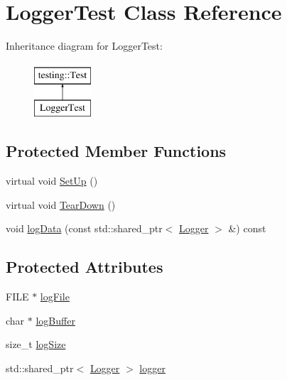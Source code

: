 \hypertarget{classLoggerTest}{}\section{Logger\+Test Class Reference}
\label{classLoggerTest}
Inheritance diagram for Logger\+Test\+:\begin{figure}[H]
\begin{center}
\leavevmode
\includegraphics[height=2.000000cm]{classLoggerTest}
\end{center}
\end{figure}
\subsection*{Protected Member Functions}
\begin{DoxyCompactItemize}
\item 
virtual void \mbox{\hyperlink{classLoggerTest_afcaba51d4a2e5229bc9e16bf70bc2713}{Set\+Up}} ()
\item 
virtual void \mbox{\hyperlink{classLoggerTest_a15b74baf82578cfb0cd04cd978bc248f}{Tear\+Down}} ()
\item 
void \mbox{\hyperlink{classLoggerTest_a5806192b9f0f6436fb32f6be8b1939ba}{log\+Data}} (const std\+::shared\+\_\+ptr$<$ \mbox{\hyperlink{classokapi_1_1Logger}{Logger}} $>$ \&) const
\end{DoxyCompactItemize}
\subsection*{Protected Attributes}
\begin{DoxyCompactItemize}
\item 
F\+I\+LE $\ast$ \mbox{\hyperlink{classLoggerTest_a1890b91ba06a9e04127a11d47a5d96c6}{log\+File}}
\item 
char $\ast$ \mbox{\hyperlink{classLoggerTest_ad2b73d8c0b5fbcb8557326e0e3cff06a}{log\+Buffer}}
\item 
size\+\_\+t \mbox{\hyperlink{classLoggerTest_a035ac6f3d02c22ee6c6012eb4c45c1f8}{log\+Size}}
\item 
std\+::shared\+\_\+ptr$<$ \mbox{\hyperlink{classokapi_1_1Logger}{Logger}} $>$ \mbox{\hyperlink{classLoggerTest_a1f9b638cb5980d7dc4773d91288b027b}{logger}}
\end{DoxyCompactItemize}
